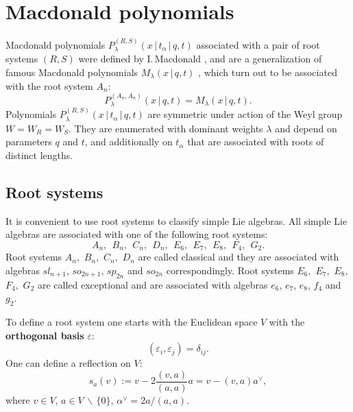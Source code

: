 \documentclass{article}
\def\ve{\varepsilon}
\def\a{\alpha}
\begin{document}
\section{Macdonald polynomials \label{MacSec}}
Macdonald polynomials $P_{\lambda}^{(R,S)} (x\,|\,t_{\alpha}\,|\,q,t)$ associated with a pair of root systems $(R,S)$ were defined by I.\,Macdonald \cite{Mac}, and are a generalization of famous Macdonald polynomials $M_{\lambda}(x\,|\,q,t)$ \cite{Mac0,Mac01}, which turn out to be associated with the root system $A_n$:
\begin{equation}
    P_{\lambda}^{(A_n,A_n)} (x \,|\,q,t) = M_{\lambda}(x\,|\,q,t).
\end{equation}
Polynomials $P_{\lambda}^{(R,S)} (x\,|\,t_{\alpha}\,|\,q,t)$ are symmetric under action of the Weyl group $W = W_R = W_S$. They are enumerated with dominant weights $\lambda$ and depend on parameters $q$ and $t$, and additionally on $t_{\alpha}$ that are associated with roots of distinct lengths.

\subsection{Root systems \label{RootSystemsSection} }
It is convenient to use root systems to  classify simple Lie algebras. All simple Lie algebras are associated with one of the following root systems:
\begin{equation}
    A_n, \ \  B_n, \ \  C_n, \ \  D_n, \ \  E_6, \ \ E_7, \ \ E_8, \ \ F_4,\ \ G_2.
\end{equation}
Root systems $ A_n, $ $  B_n,$ $  C_n, $ $  D_n$ are called classical and they are associated with algebras $sl_{n+1}$, $so_{2n+1}$, $sp_{2n}$ and $so_{2n}$ correspondingly. Root systems $E_6, $ $ E_7,$ $ E_8, $ $ F_4,$ $G_2$ are called exceptional and are associated with algebras $e_6$,  $e_7$, $e_8$, $f_4$ and $g_2$.

\vspace{10pt}
To define a root system one starts with the Euclidean space $V$ with the \textbf{orthogonal basis} $\ve$:
\begin{equation}
    (\ve_i,\ve_j) = \delta_{ij}.
    \label{Vspace}
\end{equation}
One can define a reflection on $V$:
\begin{equation}
    s_{a}(v) := v- 2\frac{(v,a)}{(a,a)}a = v - (v,a)a^{\vee},
\end{equation}
where $v\in V$, $a\in V \, \backslash \, \{0\}$, $\a^{\vee} = 2a/(a,a)$.
\end{document}
